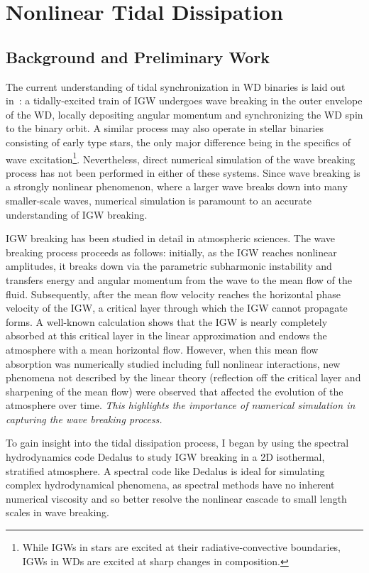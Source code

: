 \documentclass[12pt,
        usenames, %
        dvipsnames %
    ]{article}
\begin{document}
\section{Nonlinear Tidal Dissipation}\label{s:2}

\subsection{Background and Preliminary Work}

The current understanding of tidal synchronization in WD binaries is laid out
in~\cite{fullerII}: a tidally-excited train of IGW undergoes wave breaking in
the outer envelope of the WD, locally depositing angular momentum and
synchronizing the WD spin to the binary orbit. A similar process may also
operate in stellar binaries consisting of early type stars\cite{zahn75,gn89},
the only major difference being in the specifics of wave
excitation\footnote{While IGWs in stars are excited at their
radiative-convective boundaries, IGWs in WDs are excited at sharp changes in
composition.}. Nevertheless, direct numerical simulation of the wave breaking
process has not been performed in either of these systems. Since wave breaking
is a strongly nonlinear phenomenon, where a larger wave breaks down into many
smaller-scale waves, numerical simulation is paramount to an accurate
understanding of IGW breaking.

IGW breaking has been studied in detail in atmospheric sciences. The wave
breaking process proceeds as follows: initially, as the IGW reaches nonlinear
amplitudes, it breaks down via the parametric subharmonic instability and
transfers energy and angular momentum from the wave to the mean flow of the
fluid\cite{drazin}. Subsequently, after the mean flow velocity reaches the
horizontal phase velocity of the IGW, a critical layer through which the IGW
cannot propagate forms. A well-known calculation shows that the IGW is nearly
completely absorbed at this critical layer in the linear approximation and
endows the atmosphere with a mean horizontal flow\cite{booker_bretherton,hazel}.
However, when this mean flow absorption was numerically studied including full
nonlinear interactions, new phenomena not described by the linear theory
(reflection off the critical layer and sharpening of the mean flow) were
observed\cite{jones_num,winters1994} that affected the evolution of the
atmosphere over time. \emph{This highlights the importance of numerical
simulation in capturing the wave breaking process.}

To gain insight into the tidal dissipation process, I began by using the
spectral hydrodynamics code Dedalus\cite{dedalus} to study IGW breaking in a 2D
isothermal, stratified atmosphere. A spectral code like Dedalus is ideal for
simulating complex hydrodynamical phenomena, as spectral methods have no
inherent numerical viscosity and so better resolve the nonlinear cascade to
small length scales in wave breaking.
\end{document}
